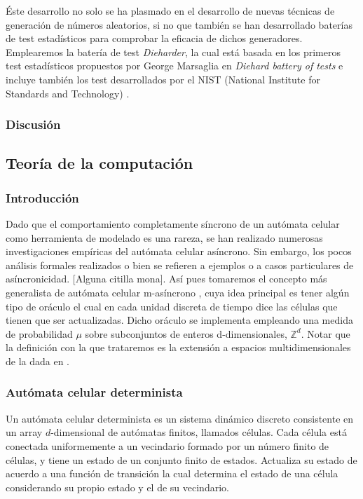 \documentclass[../proyecto.tex]{memoir}
\begin{document}
Éste desarrollo no solo se ha plasmado en el desarrollo de nuevas técnicas de generación de números aleatorios, si no que también se han desarrollado baterías de test estadísticos para comprobar la eficacia de dichos generadores. Emplearemos la batería de test \textit{Dieharder}, la cual está basada en los primeros test estadísticos propuestos por George Marsaglia en \textit{Diehard battery of tests} e incluye también los test desarrollados por el NIST (National Institute for Standards and Technology) \cite{dieharder}.

\subsubsection{Discusión}



\subsection{Teoría de la computación}

\subsubsection{Introducción}
Dado que el comportamiento completamente síncrono de un autómata celular como herramienta de modelado es una rareza, se han realizado numerosas investigaciones empíricas del autómata celular asíncrono. Sin embargo, los pocos análisis formales realizados o bien se refieren a ejemplos o a casos particulares de asíncronicidad. [Alguna citilla mona]. Así pues tomaremos el concepto más generalista de autómata celular m-asíncrono \cite{oraculo}, cuya idea principal es tener algún tipo de oráculo el cual en cada unidad discreta de tiempo dice las células que tienen que ser actualizadas. Dicho oráculo se implementa empleando una medida de probabilidad $\mu$ sobre subconjuntos de enteros d-dimensionales, $\mathds{Z}^{d}$. Notar que la definición con la que trataremos es la extensión a espacios multidimensionales de la dada en \cite{oraculo}.

\subsubsection{Autómata celular determinista}
Un autómata celular determinista es un sistema dinámico discreto consistente en un array $d$-dimensional de autómatas finitos, llamados células. Cada célula está conectada uniformemente a un vecindario formado por un número finito de células, y tiene un estado de un conjunto finito de estados. Actualiza su estado de acuerdo a una función de transición la cual determina el estado de una célula considerando su propio estado y el de su vecindario. 
\end{document}

